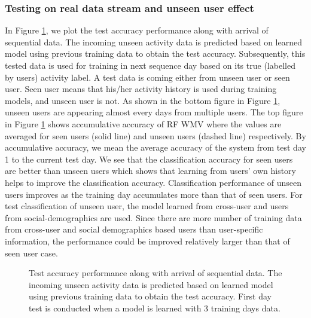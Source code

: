 \documentclass{sig-alternate}
\begin{document}
\subsubsection{Testing on real data stream and unseen user effect}
In Figure \ref{fig:testdist}, we plot the test accuracy performance along with arrival of sequential data. The incoming unseen activity data is predicted based on learned model using previous training data to obtain the test accuracy. Subsequently, this tested data is used for training in next sequence day based on its true (labelled by users) activity label. A test data is coming either from unseen user or seen user. Seen user means that his/her activity history is used during training models, and unseen user is not. As shown in the bottom figure in Figure \ref{fig:testdist}, unseen users are appearing almost every days from multiple users. The top figure in Figure \ref{fig:testdist} shows accumulative accuracy of RF WMV where the values are averaged for seen users (solid line) and unseen users (dashed line) respectively.  By accumulative accuracy, we mean the average accuracy of the system from test day 1 to the current test day. We see that the classification accuracy for seen users are better than unseen users which shows that learning from users' own history helps to improve the classification accuracy. Classification performance of unseen users improves as the training day accumulates more than that of seen users. For test classification of unseen user, the model learned from cross-user and users from social-demographics are used. Since there are more number of training data from cross-user and social demographics based users than user-specific information, the performance could be improved relatively larger than that of seen user case.   

\begin{figure}[htb]
\centering
{}
 \caption{Test accuracy performance along with arrival of sequential data. The incoming unseen activity data is predicted based on learned model using previous training data to obtain the test accuracy. First day test is conducted when a model is learned with 3 training days data. }
 \label{fig:testdist}
\end{figure}
\end{document}
